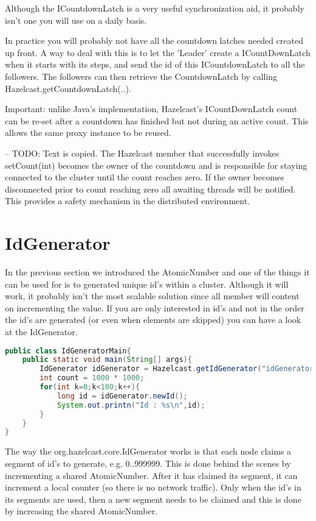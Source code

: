 Although the ICountdownLatch is a very useful synchronization aid, it probably isn't one you will use on a daily basis.

In practice you will probably not have all the countdown latches needed created up front. A way to deal with this is to let the 'Leader' create a ICountDownLatch when it starts with its steps, and send the id of this ICountdownLatch to all the followers. The followers can then retrieve the CountdownLatch by calling Hazelcast.getCountdownLatch(..).

Important: unlike Java's implementation, Hazelcast's ICountDownLatch count can be re-set after a countdown has finished but not during an active count. This allows the same proxy instance to be reused.

-- TODO: Text is copied.
The Hazelcast member that successfully invokes setCount(int) becomes the owner of the countdown and is responsible for staying connected to the cluster until the count reaches zero. If the owner  becomes disconnected prior to count reaching zero all awaiting threads will be notified. This provides a safety mechanism in the distributed environment.


\section{IdGenerator}

In the previous section we introduced the AtomicNumber and one of the things it can be used for is to generated unique id's within a cluster. Although it will work, it probably isn't the most scalable solution since all member will content on incrementing the value. If you are only interested in id's and not in the order the id's are generated (or even when elements are skipped) you can have a look at the IdGenerator.

\begin{lstlisting}[language=java]
public class IdGeneratorMain{
    public static void main(String[] args){
        IdGenerator idGenerator = Hazelcast.getIdGenerator("idGenerator");
        int count = 1000 * 1000;
        for(int k=0;k<100;k++){
            long id = idGenerator.newId();
            System.out.printn("Id : %s\n",id);
        }
    }
}
\end{lstlisting}

The way the org.hazelcast.core.IdGenerator works is that each node claims a segment of id's to generate, e.g. 0..999999. This is done behind the scenes by incrementing a shared AtomicNumber. After it has claimed its segment, it can increment a local counter (so there is no network traffic). Only when the id's in its segments are used, then a new segment needs to be claimed and this is done by increasing the shared AtomicNumber.

